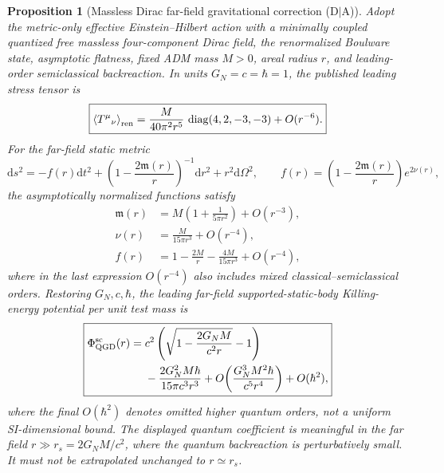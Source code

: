 \documentclass[11pt,a4paper]{article}
\newtheorem{proposition}[theorem]{Proposition}
\newcommand{\dd}{\mathrm d}
\begin{document}
\begin{proposition}[Massless Dirac far-field gravitational correction
(D$\mid$A)]\label{prop:diracfarfield}
Adopt the metric-only effective Einstein--Hilbert action with a
minimally coupled quantized free massless four-component Dirac field,
the renormalized Boulware state, asymptotic flatness, fixed ADM mass
$M>0$, areal radius $r$, and leading-order semiclassical backreaction.
In units $G_N=c=\hbar=1$, the published leading stress tensor is
\begin{equation}\label{eq:diracRSET}
\boxed{\left\langle T^\mu{}_{\nu}\right\rangle_{\rm ren}
=\frac{M}{40\pi^2r^5}\,
\operatorname{diag}(4,2,-3,-3)+O(r^{-6}).}
\end{equation}
For the far-field static metric
\begin{equation}\label{eq:scmetric}
\dd s^2=-f(r)\dd t^2+
\left(1-\frac{2\mathfrak m(r)}r\right)^{-1}\dd r^2
+r^2\dd\Omega^2,\qquad
f(r)=\left(1-\frac{2\mathfrak m(r)}r\right)e^{2\nu(r)},
\end{equation}
the asymptotically normalized functions satisfy
\begin{align}
\mathfrak m(r)&=M\left(1+\frac1{5\pi r^2}\right)
+O(r^{-3}),\label{eq:massfn}\\
\nu(r)&=\frac{M}{15\pi r^3}+O(r^{-4}),\label{eq:nufn}\\
f(r)&=1-\frac{2M}{r}-\frac{4M}{15\pi r^3}
+O(r^{-4}),\label{eq:scf}
\end{align}
where in the last expression $O(r^{-4})$ also includes mixed
classical--semiclassical orders.  Restoring $G_N,c,\hbar$, the
\emph{leading far-field} supported-static-body Killing-energy
potential per unit test mass is
\begin{equation}\label{eq:QGD97Phi}
\boxed{\begin{aligned}
\Phi_{\rm QGD}^{\rm sc}(r)={}&c^2\left(
\sqrt{1-\frac{2G_NM}{c^2r}}-1\right)\\
&-\frac{2G_N^2M\hbar}{15\pi c^3r^3}
+O\!\left(\frac{G_N^3M^2\hbar}{c^5r^4}\right)
+O(\hbar^2),
\end{aligned}}
\end{equation}
where the final $O(\hbar^2)$ denotes omitted higher quantum orders,
not a uniform SI-dimensional bound.  The displayed quantum coefficient
is meaningful in the far field $r\gg r_s=2G_NM/c^2$, where the
quantum backreaction is perturbatively small.  It must not be
extrapolated unchanged to $r\simeq r_s$.
\end{proposition}
\end{document}
